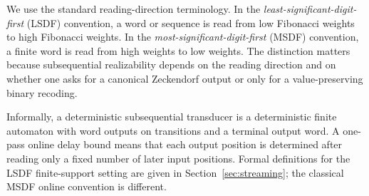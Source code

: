 \documentclass[11pt,letterpaper]{article}
\numberwithin{equation}{section}
\theoremstyle{plain}
\theoremstyle{definition}
\theoremstyle{remark}
\begin{document}
We use the standard reading-direction terminology.  In the
\emph{least-significant-digit-first} (LSDF) convention, a word or sequence is
read from low Fibonacci weights to high Fibonacci weights.  In the
\emph{most-significant-digit-first} (MSDF) convention, a finite word is read
from high weights to low weights.  The distinction matters because
subsequential realizability depends on the reading direction and on whether
one asks for a canonical Zeckendorf output or only for a value-preserving
binary recoding.

Informally, a deterministic subsequential transducer is a deterministic finite
automaton with word outputs on transitions and a terminal output word.  A
one-pass online delay bound means that each output position is determined after
reading only a fixed number of later input positions.  Formal definitions for
the LSDF finite-support setting are given in Section~\ref{sec:streaming}; the
classical MSDF online convention is different.
\end{document}
